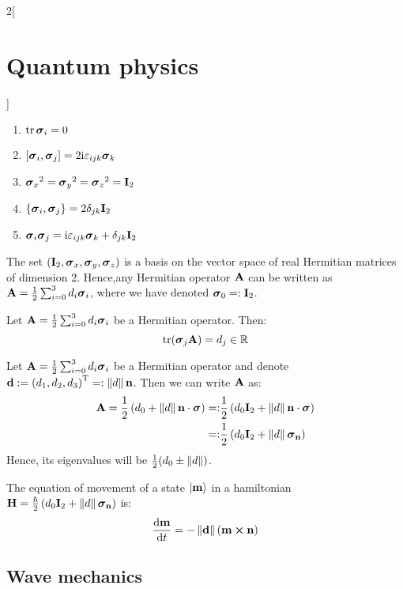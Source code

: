 \documentclass[../../../main_physics.tex]{subfiles}
\begin{document}
\begin{multicols}{2}[\section{Quantum physics}]
\begin{proposition}
    \begin{enumerate}
      \item $\trace \vf\sigma_i=0$
      \item $\comm{\vf\sigma_i}{\vf\sigma_j}=2\ii \varepsilon_{ijk}\vf\sigma_k$
      \item ${\boldsymbol{\mathrm{\sigma}}_x}^2={\boldsymbol{\mathrm{\sigma}}_y}^2={\boldsymbol{\mathrm{\sigma}}_z}^2=\boldsymbol{\mathrm{I}}_2$
      \item $\acomm{\vf\sigma_i}{\vf\sigma_j}=2\delta_{jk}\vf{I}_2$
      \item $\boldsymbol{\mathrm{\sigma}}_i\boldsymbol{\mathrm{\sigma}}_j=\mathrm{i} \varepsilon_{ijk}\boldsymbol{\mathrm{\sigma}}_k+\delta_{jk}\boldsymbol{\mathrm{I}}_2$
    \end{enumerate}
  \end{proposition}
  \begin{theorem}
    The set $(\boldsymbol{\mathrm{I}}_2,\boldsymbol{\mathrm{\sigma}}_x,\boldsymbol{\mathrm{\sigma}}_y,\boldsymbol{\mathrm{\sigma}}_z)$ is a basis on the vector space of real Hermitian matrices of dimension 2. Hence,any Hermitian operator $\boldsymbol{\mathrm{A}}$ can be written as $\boldsymbol{\mathrm{A}}=\frac{1}{2}\sum_{i=0}^3d_i\boldsymbol{\mathrm{\sigma}}_i$, where we have denoted $\boldsymbol{\mathrm{\sigma}}_0=:\boldsymbol{\mathrm{I}}_2$.
  \end{theorem}
  \begin{lemma}
    Let $\boldsymbol{\mathrm{A}}=\frac{1}{2}\sum_{i=0}^3d_i\boldsymbol{\mathrm{\sigma}}_i$ be a Hermitian operator. Then: $$\trace(\vf\sigma_j\vf{A})=d_j\in\RR$$
  \end{lemma}
  \begin{proposition}
    Let $\boldsymbol{\mathrm{A}}=\frac{1}{2}\sum_{i=0}^3d_i\boldsymbol{\mathrm{\sigma}}_i$ be a Hermitian operator and denote $\boldsymbol{\mathrm{d}}:={(d_1,d_2,d_3)}^{\mathrm{T}}=:\left\|d\right\|\boldsymbol{\mathrm{n}}$. Then we can write $\boldsymbol{\mathrm{A}}$ as:
    \begin{align*}
      \boldsymbol{\mathrm{A}}=\frac{1}{2}\left(d_0+\left\|d\right\|\boldsymbol{\mathrm{n}}\cdot\boldsymbol{\mathrm{\sigma}}\right)=: & \frac{1}{2}\left(d_0\boldsymbol{\mathrm{I}}_2+\left\|d\right\|\boldsymbol{\mathrm{n}}\cdot\boldsymbol{\mathrm{\sigma}}\right) \\=:&\frac{1}{2}\left(d_0\boldsymbol{\mathrm{I}}_2+\left\|d\right\|\boldsymbol{\mathrm{\sigma}}_{\boldsymbol{\mathrm{n}}}\right)
    \end{align*}
    Hence, its eigenvalues will be $\frac{1}{2}(d_0\pm\left\|d\right\|)$.
  \end{proposition}
  \begin{theorem}
    The equation of movement of a state $\ket{\boldsymbol{\mathrm{m}}}$ in a hamiltonian $\boldsymbol{\mathrm{H}}=\frac{\hbar}{2}\left(d_0\boldsymbol{\mathrm{I}}_2+\left\|d\right\|\boldsymbol{\mathrm{\sigma}}_{\boldsymbol{\mathrm{n}}}\right)$ is:
    $$\dv{\vf{m}}{t}=-\norm{\vf{d}}({\vf{m}}\crossprod{\vf{n}})$$
  \end{theorem}
  \subsection{Wave mechanics}
\end{multicols}
\end{document}

